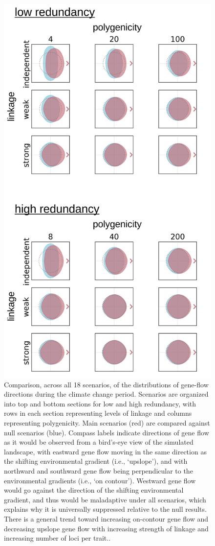 \documentclass[9pt,twocolumn,twoside,lineno]{pnas-new}
\begin{document}
\begin{figure}
\centering
\includegraphics[width=.8\linewidth]{pub/figs/FIG_2_gene_flow.jpg}
\caption{Comparison, across all 18 scenarios, of the distributions of gene-flow directions during the climate change period. Scenarios are organized into top and bottom sections for low and high redundancy, with rows in each section representing levels of linkage and columns representing polygenicity. Main scenarios (red) are compared against null scenarios (blue). Compass labels indicate directions of gene flow as it would be observed from a bird’s-eye view of the simulated landscape, with eastward gene flow moving in the same direction as the shifting environmental gradient (i.e., ‘upslope’), and with northward and southward gene flow being perpendicular to the environmental gradients (i.e., ‘on contour’). Westward gene flow would go against the direction of the shifting environmental gradient, and thus would be maladaptive under all scenarios, which explains why it is universally suppressed relative to the null results. There is a general trend toward increasing on-contour gene flow and decreasing upslope gene flow with increasing strength of linkage and increasing number of loci per trait..
}
\label{fig:fig_2}
\end{figure}
\end{document}
